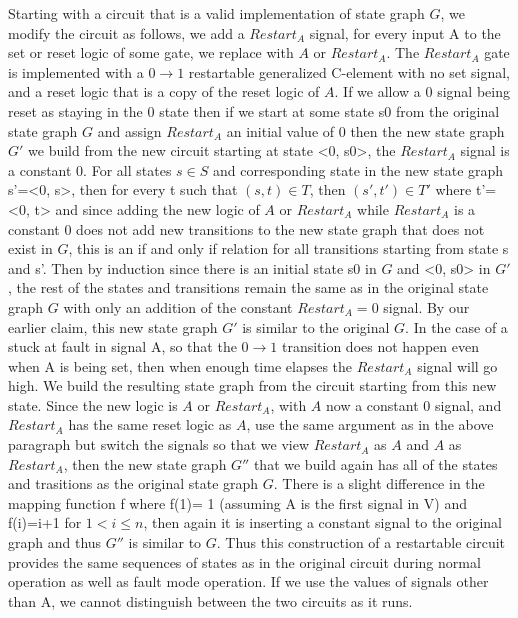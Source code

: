 \documentclass{article}
\begin{document}
Starting with a circuit that is a valid implementation of state graph $G$, we modify the circuit as follows, we add a $Restart_A$ signal, for every input A to the set or reset logic of some gate, we replace with 
$A$ or $Restart_A$.  The $Restart_A$ gate is implemented with a $0 \to 1$ restartable generalized C-element with no set signal, and a reset logic that is a copy of the reset logic of $A$.  If we allow a 0 signal 
being reset as staying in the 0 state then if we start at some state s0 from the original state graph $G$ and assign $Restart_A$ an initial value of 0 then the new state graph $G'$ we build from the new circuit starting
at state <0, s0>, the $Restart_A$ signal is a constant 0.  For all states $s \in S$ and corresponding state in the new state graph s'=<0, s>, then for every t such that $(s,t) \in T$, then $(s', t') \in T'$ where 
t'=<0, t> and since adding the new logic of $A$ or $Restart_A$ while $Restart_A$ is a constant 0 does not add new transitions to the new state graph that does not exist in $G$, this is an if and only if relation 
for all transitions starting from state s and s'.  Then by induction since there is an initial state s0 in $G$ and <0, s0> in $G'$, the rest of the states and transitions remain the same as in the original state graph $G$ 
with only an addition of the constant $Restart_A=0$ signal.  By our earlier claim, this new state graph $G'$ is similar to the original $G$.
\newline \newline
In the case of a stuck at fault in signal A, so that the $0\to1$ transition does not happen even when A is being set, then when enough time elapses the $Restart_A$ signal will go high. We build the resulting state graph from 
the circuit starting from this new state.  Since the new logic is $A$ or $Restart_A$, with $A$ now a constant 0 signal, and $Restart_A$ has the same reset logic as $A$, use the same argument as in the above paragraph 
but switch the signals so that we view $Restart_A$ as $A$ and $A$ as $Restart_A$, then the new state graph $G''$ that we build again has all of the states and trasitions as the original state graph $G$.  There is a slight 
difference in the mapping function f where f(1)= 1 (assuming A is the first signal in V) and f(i)=i+1 for $1< i \leq n$, then again it is inserting a constant signal to the original graph and thus $G''$ is similar to $G$.
\newline \newline
Thus this construction of a restartable circuit provides the same sequences of states as in the original circuit during normal operation as well as fault mode operation.  If we use the values of signals other than A, we cannot 
distinguish between the two circuits as it runs.
\end{document}

